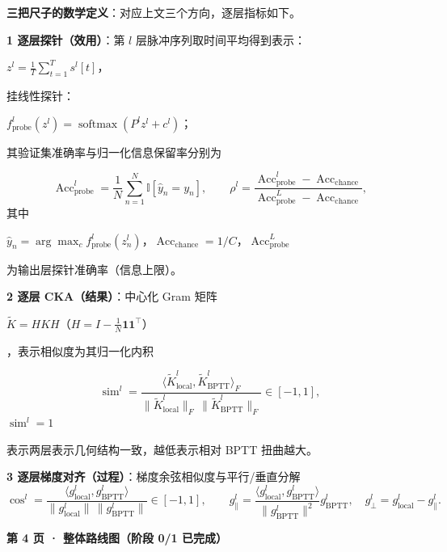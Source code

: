 \documentclass[journal,12pt,onecolumn]{IEEEtran}
\begin{document}
\textbf{三把尺子的数学定义}：对应上文三个方向，逐层指标如下。

\textbf{1 逐层探针（效用）}：第 $l$ 层脉冲序列取时间平均得到表示：

$z^l=\frac{1}{T}\sum_{t=1}^{T}s^l[t]$，

挂线性探针：

$f^l_{\mathrm{probe}}(z^l)=\operatorname{softmax}(P^l z^l+c^l)$；

其验证集准确率与归一化信息保留率分别为

\begin{equation}
\operatorname{Acc}^l_{\mathrm{probe}}=\frac{1}{N}\sum_{n=1}^{N}\mathbb I[\hat y_n=y_n],
\qquad
\rho^l=\frac{\operatorname{Acc}^l_{\mathrm{probe}}-\operatorname{Acc}_{\mathrm{chance}}}{\operatorname{Acc}^L_{\mathrm{probe}}-\operatorname{Acc}_{\mathrm{chance}}},
\end{equation}
其中 

$\hat y_n=\arg\max_c f^l_{\mathrm{probe}}(z^l_n)$，$\operatorname{Acc}_{\mathrm{chance}}=1/C$，$\operatorname{Acc}^L_{\mathrm{probe}}$ 

为输出层探针准确率（信息上限）。

\textbf{2 逐层 CKA（结果）}：中心化 Gram 矩阵 

$\tilde K=HKH$（$H=I-\frac{1}{N}\mathbf{1}\mathbf{1}^\top$）

，表示相似度为其归一化内积

\begin{equation}
\operatorname{sim}^l=\frac{\langle \tilde K^l_{\mathrm{local}},\tilde K^l_{\mathrm{BPTT}}\rangle_F}{\|\tilde K^l_{\mathrm{local}}\|_F\,\|\tilde K^l_{\mathrm{BPTT}}\|_F}\in[-1,1],
\end{equation}
$\operatorname{sim}^l=1$ 

表示两层表示几何结构一致，越低表示相对 BPTT 扭曲越大。

\textbf{3 逐层梯度对齐（过程）}：梯度余弦相似度与平行/垂直分解
\begin{equation}
\cos^l=\frac{\langle g^l_{\mathrm{local}},g^l_{\mathrm{BPTT}}\rangle}{\|g^l_{\mathrm{local}}\|\,\|g^l_{\mathrm{BPTT}}\|}\in[-1,1],
\qquad
g^l_{\parallel}=\frac{\langle g^l_{\mathrm{local}},g^l_{\mathrm{BPTT}}\rangle}{\|g^l_{\mathrm{BPTT}}\|^2}g^l_{\mathrm{BPTT}},\quad g^l_{\perp}=g^l_{\mathrm{local}}-g^l_{\parallel}.
\end{equation}

\textbf{第 4 页 · 整体路线图（阶段 0/1 已完成）}
\end{document}
